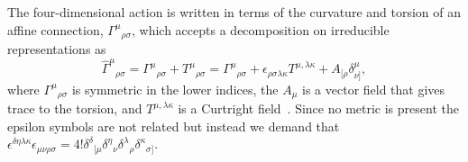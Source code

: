 \documentclass[aps,prl,twocolumn,superscriptaddress,showpacs,showkeys]{revtex4-1}
\begin{document}
The four-dimensional action is written in terms of the curvature and torsion of an affine connection, $\Gamma^\mu{}_{\rho\sigma}$, which accepts a decomposition on irreducible representations as
\begin{equation}
  \hat{\Gamma}^\mu{}_{\rho\sigma} = {\Gamma}^\mu{}_{\rho\sigma} + T^\mu{}_{\rho\sigma} = {\Gamma}^\mu{}_{\rho\sigma} + \epsilon_{\rho\sigma\lambda\kappa}T^{\mu,\lambda\kappa}+A_{[\rho}\delta^\mu_{\nu]},
\end{equation}
where ${\Gamma}^\mu{}_{\rho\sigma}$ is symmetric in the lower indices, the $A_\mu$ is a vector field that gives trace to the torsion, and  $T^{\mu,\lambda\kappa}$ is a Curtright field~\cite{Curtright:1980yk}. Since no metric is present  the epsilon symbols are not related but instead we demand that \mbox{$\epsilon^{\delta\eta\lambda\kappa}\epsilon_{\mu\nu\rho\sigma}=4!\delta^{\delta}{}_{[\mu}\delta^\eta{}_{\nu}\delta^{\lambda}{}_{\rho} \delta^\kappa{}_{\sigma]}$.}
\end{document}
